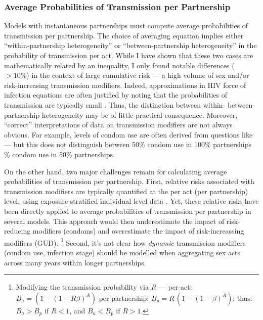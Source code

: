 \subsubsection{Average Probabilities of Transmission per Partnership}
Models with instantaneous partnerships must compute
average probabilities of transmission per partnership.
The choice of averaging equation implies either
``within-partnership heterogeneity'' or ``between-partnership heterogeneity''
in the probability of transmission per act.
While I have shown that these two cases are mathematically related by an inequality,
I only found notable differences (\eg~$>10\%$) in the context of large cumulative risk
--- \eg a high volume of sex and/or risk-increasing transmission modifiers.
Indeed, approximations in HIV force of infection equations are often justified by noting that
the probabilities of transmission are typically small \cite{Kerr2015}.
Thus, the distinction between within- \vs between-partnership heterogeneity
may be of little practical consequence.
Moreover, ``correct'' interpretations of data on transmission modifiers are not always obvious.
For example, levels of condom use are often derived from questions like
--- but this does not distinguish between
50\% condom use in 100\% partnerships \% condom use in 50\% partnerships.
\par
On the other hand, two major challenges remain for
calculating average probabilities of transmission per partnership.
First, relative risks associated with transmission modifiers
are typically quantified at the per act (\vs per partnership) level, using
exposure-stratified individual-level data \cite{Jewell1990hiv,Gray2001,Wawer2005,Boily2009}.
Yet, these relative risks have been directly applied to
average probabilities of transmission per partnership in several models.
This approach would then
underestimate the impact of risk-reducing modifiers (\eg condoms) and
overestimate the impact of risk-increassing modifiers (\eg GUD).%
\footnote{Modifying the transmission probability via $R$ ---
  per-act: $B_a = (1 - {(1 - R\beta)}^A)$ \vs per-partnership: $B_p = R\,(1 - {(1 - \beta)}^A)$;
  thus: $B_a > B_p$ if $R < 1$, and $B_a < B_p$ if $R > 1$.}
Second, it's not clear how \emph{dynamic} transmission modifiers (\eg condom use, infection stage)
should be modelled when aggregating sex acts across many years within longer partnerships.

